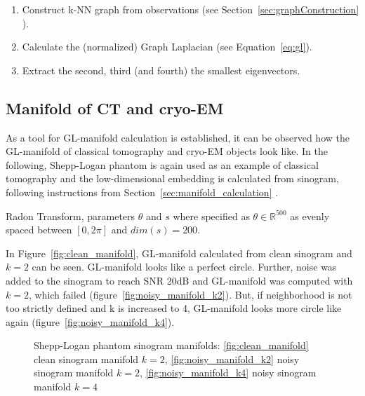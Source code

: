 \begin{enumerate}
    \item Construct k-NN graph from observations (see Section~\ref{sec:graphConstruction} \textit{}).
    \item Calculate the (normalized) Graph Laplacian (see Equation~\ref{eq:gl}).
    \item Extract the second, third (and fourth) the smallest eigenvectors.
\end{enumerate}

\subsection{Manifold of CT and cryo-EM}
\label{sec:manifold_ct_cryoEM}
As a tool for GL-manifold calculation is established, it can be observed how the GL-manifold of classical tomography and cryo-EM objects look like.
In the following, Shepp-Logan phantom is again used as an example of classical tomography
and the low-dimensional embedding is calculated from sinogram, following instructions from 
Section~\ref{sec:manifold_calculation} \textit{}.

Radon Transform, parameters $\theta$ and $s$ where specified as $\theta \in \mathbb{R}^{500}$ as evenly spaced
between $[0, 2 \pi]$ and $dim(s) = 200$. 

In Figure~\ref{fig:clean_manifold}, GL-manifold calculated from clean sinogram and $k=2$ can be seen.
GL-manifold looks like a perfect circle. Further, noise was added to the sinogram 
to reach SNR 20dB and GL-manifold was computed with $k=2$, which failed (figure~\ref{fig:noisy_manifold_k2}).
But, if neighborhood is not too strictly defined and k is increased to 4, GL-manifold looks more circle like again
(figure~\ref{fig:noisy_manifold_k4}).

\begin{figure}[H]
    \centering
    \hfill
        \hfill
    \hfill
    \hfill
    \caption{Shepp-Logan phantom sinogram manifolds:
    \ref{fig:clean_manifold} clean sinogram manifold $k=2$,
    \ref{fig:noisy_manifold_k2} noisy sinogram manifold $k=2$,
    \ref{fig:noisy_manifold_k4} noisy sinogram manifold $k=4$
    }
\end{figure}

